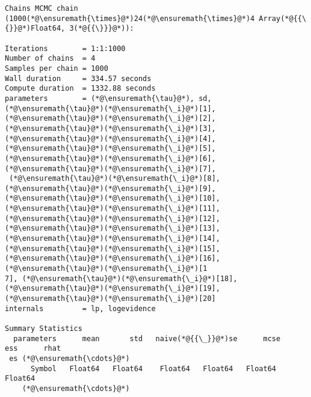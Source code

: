 \documentclass[12pt,a4paper]{article}
\begin{document}
\begin{lstlisting}
Chains MCMC chain (1000(*@\ensuremath{\times}@*)24(*@\ensuremath{\times}@*)4 Array(*@{{\{}}@*)Float64, 3(*@{{\}}}@*)):

Iterations        = 1:1:1000
Number of chains  = 4
Samples per chain = 1000
Wall duration     = 334.57 seconds
Compute duration  = 1332.88 seconds
parameters        = (*@\ensuremath{\tau}@*), sd, (*@\ensuremath{\tau}@*)(*@\ensuremath{\_i}@*)[1], (*@\ensuremath{\tau}@*)(*@\ensuremath{\_i}@*)[2], (*@\ensuremath{\tau}@*)(*@\ensuremath{\_i}@*)[3], (*@\ensuremath{\tau}@*)(*@\ensuremath{\_i}@*)[4], (*@\ensuremath{\tau}@*)(*@\ensuremath{\_i}@*)[5], (*@\ensuremath{\tau}@*)(*@\ensuremath{\_i}@*)[6], (*@\ensuremath{\tau}@*)(*@\ensuremath{\_i}@*)[7],
 (*@\ensuremath{\tau}@*)(*@\ensuremath{\_i}@*)[8], (*@\ensuremath{\tau}@*)(*@\ensuremath{\_i}@*)[9], (*@\ensuremath{\tau}@*)(*@\ensuremath{\_i}@*)[10], (*@\ensuremath{\tau}@*)(*@\ensuremath{\_i}@*)[11], (*@\ensuremath{\tau}@*)(*@\ensuremath{\_i}@*)[12], (*@\ensuremath{\tau}@*)(*@\ensuremath{\_i}@*)[13], (*@\ensuremath{\tau}@*)(*@\ensuremath{\_i}@*)[14], (*@\ensuremath{\tau}@*)(*@\ensuremath{\_i}@*)[15], (*@\ensuremath{\tau}@*)(*@\ensuremath{\_i}@*)[16], (*@\ensuremath{\tau}@*)(*@\ensuremath{\_i}@*)[1
7], (*@\ensuremath{\tau}@*)(*@\ensuremath{\_i}@*)[18], (*@\ensuremath{\tau}@*)(*@\ensuremath{\_i}@*)[19], (*@\ensuremath{\tau}@*)(*@\ensuremath{\_i}@*)[20]
internals         = lp, logevidence

Summary Statistics
  parameters      mean       std   naive(*@{{\_}}@*)se      mcse       ess      rhat  
 es (*@\ensuremath{\cdots}@*)
      Symbol   Float64   Float64    Float64   Float64   Float64   Float64  
    (*@\ensuremath{\cdots}@*)


\end{lstlisting}
\end{document}
